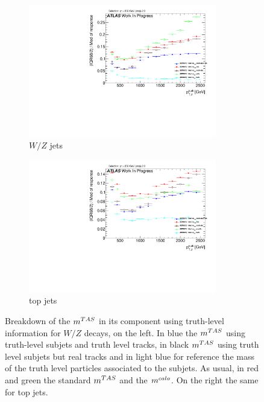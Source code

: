 
\begin{figure}
    \centering
    \begin{subfigure}[b]{0.45\textwidth}
  \centering
      \includegraphics[width=0.9\textwidth]{jet_part/calib/71graphcftr_h_JetRatio_mJ12CALOIQRoM4Truths.pdf}
  \caption[Breakdown of the $\mtas$ ]{$W/Z$ jets}
  \label{fig:breakdown2}
    \end{subfigure}
    \begin{subfigure}[b]{0.45\textwidth}
  \centering
      \includegraphics[width=0.9\textwidth]{jet_part/appendixA/71graphcftr_h_JetRatio_mJ12CALOIQRoM4TruthsTops.pdf}
  \caption[Breakdown of the $\mtas$ ]{top jets}
  \label{fig:breakdown3}
 
    \end{subfigure}
    \caption[Breakdown of the $\mtas$]{Breakdown of the $\mtas$ in its component using truth-level information for $W/Z$ decays, on the left. In blue the $\mtas$ using truth-level subjets and truth level tracks, in black $\mtas$ using truth level subjets but real tracks and in light blue for reference the mass of the truth level particles associated to the subjets. As usual, in red and green the standard $\mtas$ and the $m^{calo}$. On the right the same for top jets.} 
\end{figure}

